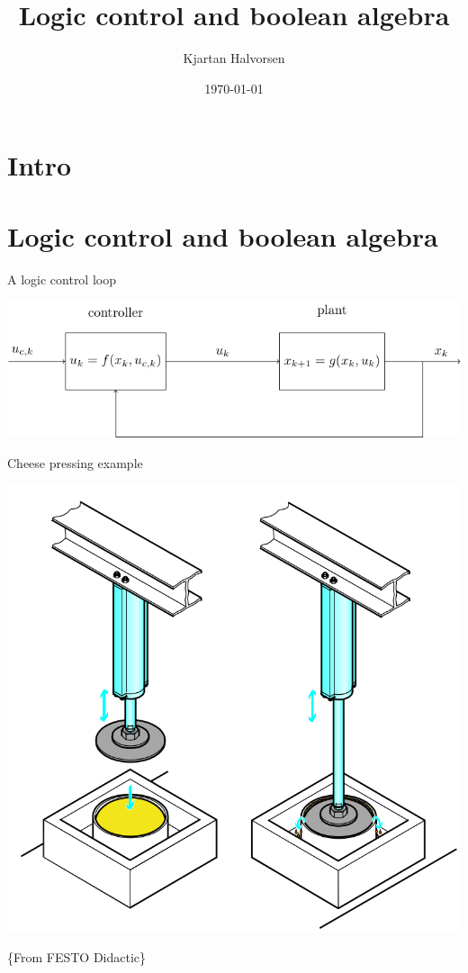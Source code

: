 \documentclass[presentation,aspectratio=1610]{beamer}
\author{Kjartan Halvorsen}
\date{\today}
\title{Logic control and boolean algebra}
\begin{document}
\maketitle

\section{Intro}
\label{sec:org67c67af}



\section{Logic control and boolean algebra}
\label{sec:org81ff278}
\begin{frame}[label={sec:orgc2fb03f}]{A logic control loop}
\begin{center}
\includegraphics[width=\linewidth]{../../figures/logic-control-loop}
\end{center}
\end{frame}

\begin{frame}[label={sec:org895be34}]{Cheese pressing example}
\begin{center}
\includegraphics[width=0.5\linewidth]{../../figures/cheese-stamping.png}
\end{center}
\begin{LaTeX}
\{\tiny From FESTO Didactic\}
\end{LaTeX}
\end{frame}
\end{document}
